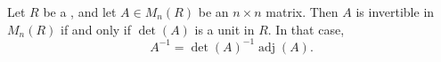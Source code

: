 \begin{proposition} \label{proposition:determinant_characterizes_invertibility_of_matrices_over_a_commutative_ring}
    Let $R$ be a , and let $A \in M_n(R)$ be an $n \times n$ matrix. Then $A$ is invertible in $M_n(R)$ if and only if $\det(A)$ is a unit in $R$. In that case,
    $$A^{-1} = \det(A)^{-1} \operatorname{adj}(A).$$
\end{proposition}